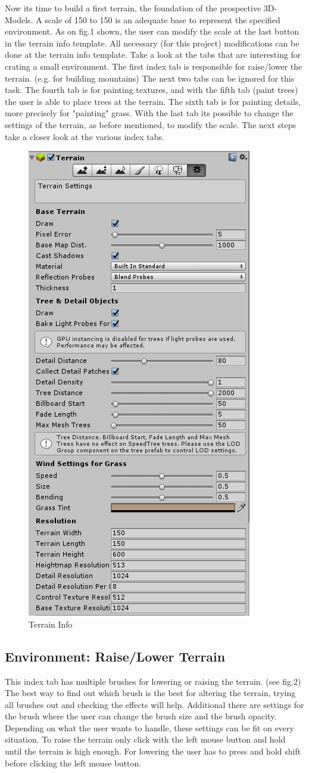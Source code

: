 \documentclass[conference]{IEEEtran}
\begin{document}
Now its time to build a first terrain, the foundation of the prospective 3D-Models. A scale of 150 to 150 is an adequate base to represent the specified environment. As on fig.1 shown, the user can modify the scale at the last button in the terrain info template. All necessary (for this project) modifications can be done at the terrain info template. Take a look at the tabs that are interesting for crating a small environment. The first index tab is responsible for raise/lower the terrain. (e.g. for building mountains) The next two tabs can be ignored for this task. The fourth tab is for painting textures, and with the fifth tab (paint trees) the user is able to place trees at the terrain. The sixth tab is for painting details, more precisely for "painting" grass. With the last tab its possible to change the settings of the terrain, as before mentioned, to modify the scale. The next steps take a closer look at the various index tabs.
\begin{figure}[htbp]
  \includegraphics[width=.4\textwidth]{pictures/terrain_info}
  \caption{Terrain Info}
  \label{fig:terrain_info}
\end{figure}

\subsection{Environment: Raise/Lower Terrain}
This index tab has multiple brushes for lowering or raising the terrain. (see fig.2) The best way to find out which brush is the
best for altering the terrain, trying all brushes out and checking the effects will help. Additional there are settings for the brush where the user can change the brush size and the brush opacity. Depending on what the user wants to handle, these settings can be fit on every situation. To raise the terrain only click with the left mouse button and hold until the terrain is high enough. For lowering the user has to press and hold shift before clicking the left mouse button.
 
\end{document}
